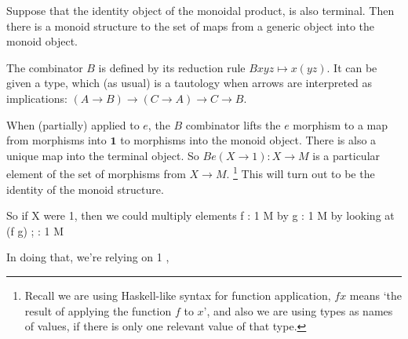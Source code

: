 \documentclass[14pt]{article}
\begin{document}
\quad{}\quad


Suppose that the identity object of the monoidal product,
is also terminal. Then there is a monoid structure
to the set of maps from a generic object
into the monoid object.

The combinator \(B\) is defined by its reduction rule \(B x y z \mapsto x (y z)\). It can be given a type, which (as usual) is a tautology when arrows are interpreted as implications: \((A \to B) \to (C \to A) \to C \to B\). 

When (partially) applied to \(e\), the \(B\) combinator lifts the \(e\) morphism to a map from morphisms into \(\mathbf{1}\) to morphisms into the monoid object. There is also a unique map into the terminal object. So \(B e (X \to 1) : X \to M\) is a particular element of the set of morphisms from \(X \to M\). \footnote{Recall we are using Haskell-like syntax for function application, \(f x\) means `the result of applying the function \(f\) to \(x\)', and also we are using types as names of values, if there is only one relevant value of that type.} This will turn out to be the identity of the monoid structure.

So if X were 1, then we could multiply elements
f : 1 \to M by g : 1 \to M by looking at
(f \times g) ; \mu : 1  \to M

In doing that, we're relying on 1  ,


\end{document}
